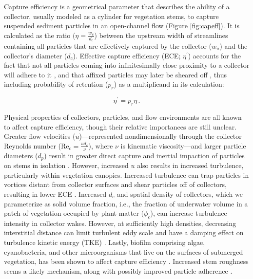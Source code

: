\documentclass[geosciences,article,submit,moreauthors,pdftex]{Definitions/mdpi}
\newcommand\Rey{\mathrm{Re}}
\begin{document}
Capture efficiency is a geometrical parameter that describes the ability of a collector, usually modeled as a cylinder for vegetation stems, to capture suspended sediment particles in an open-channel flow (Figure \ref{fig:capeff}). It is calculated as the ratio ($\eta=\frac{w_u}{d_c}$) between the upstream width of streamlines containing all particles that are effectively captured by the collector ($w_u$) and the collector's diameter ($d_c$). Effective capture efficiency (ECE; $\eta^\prime$) accounts for the fact that not all particles coming into infinitesimally close proximity to a collector will adhere to it \cite{spielman1977particle, wu2012single}, and that affixed particles may later be sheared off \cite{peruzzo2012capillary}, thus including probability of retention ($p_r$) as a multiplicand in its calculation:

\begin{equation}
    \eta^\prime=p_r \eta\,.
    \label{eq:ece}
\end{equation}

Physical properties of collectors, particles, and flow environments are all known to affect capture efficiency, though their relative importances are still unclear. Greater flow velocities ($u$)---represented nondimensionally through the collector Reynolds number ($\Rey_c=\frac{ud_c}{\nu}$), where $\nu$ is kinematic viscosity---and larger particle diameters ($d_p$) result in greater direct capture and inertial impaction of particles on stems in isolation \cite{Palmer_2004,fuchs1965mechanics}. However, increased $u$ also results in increased turbulence, particularly within vegetation canopies. Increased turbulence can trap particles in vortices distant from collector surfaces and shear particles off of collectors, resulting in lower ECE \cite{Fauria_2015}. Increased $d_c$ and spatial density of collectors, which we parameterize as solid volume fraction, i.e., the fraction of underwater volume in a patch of vegetation occupied by plant matter ($\phi_c$), can increase turbulence intensity in collector wakes. However, at sufficiently high densities, decreasing interstitial distance can limit turbulent eddy scale and have a damping effect on turbulence kinetic energy (TKE) \cite{nepf_drag_1999, leonard1995flow}. Lastly, biofilm comprising algae, cyanobacteria, and other microorganisms that live on the surfaces of submerged vegetation, has been shown to affect capture efficiency \cite{Fauria_2015}. Increased stem roughness \cite{Palmer_2004} seems a likely mechanism, along with possibly improved particle adherence \cite{wu2014colloid}.
\end{document}
